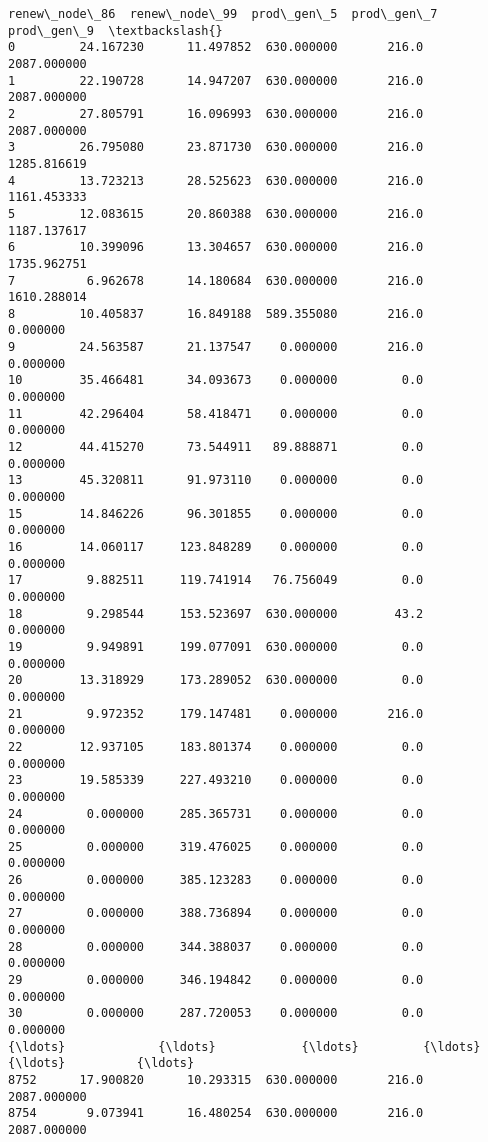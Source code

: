 \documentclass[11pt]{article}
\begin{document}
\begin{Verbatim}[commandchars=\\\{\}]
      renew\_node\_86  renew\_node\_99  prod\_gen\_5  prod\_gen\_7   prod\_gen\_9  \textbackslash{}
0         24.167230      11.497852  630.000000       216.0  2087.000000   
1         22.190728      14.947207  630.000000       216.0  2087.000000   
2         27.805791      16.096993  630.000000       216.0  2087.000000   
3         26.795080      23.871730  630.000000       216.0  1285.816619   
4         13.723213      28.525623  630.000000       216.0  1161.453333   
5         12.083615      20.860388  630.000000       216.0  1187.137617   
6         10.399096      13.304657  630.000000       216.0  1735.962751   
7          6.962678      14.180684  630.000000       216.0  1610.288014   
8         10.405837      16.849188  589.355080       216.0     0.000000   
9         24.563587      21.137547    0.000000       216.0     0.000000   
10        35.466481      34.093673    0.000000         0.0     0.000000   
11        42.296404      58.418471    0.000000         0.0     0.000000   
12        44.415270      73.544911   89.888871         0.0     0.000000   
13        45.320811      91.973110    0.000000         0.0     0.000000   
15        14.846226      96.301855    0.000000         0.0     0.000000   
16        14.060117     123.848289    0.000000         0.0     0.000000   
17         9.882511     119.741914   76.756049         0.0     0.000000   
18         9.298544     153.523697  630.000000        43.2     0.000000   
19         9.949891     199.077091  630.000000         0.0     0.000000   
20        13.318929     173.289052  630.000000         0.0     0.000000   
21         9.972352     179.147481    0.000000       216.0     0.000000   
22        12.937105     183.801374    0.000000         0.0     0.000000   
23        19.585339     227.493210    0.000000         0.0     0.000000   
24         0.000000     285.365731    0.000000         0.0     0.000000   
25         0.000000     319.476025    0.000000         0.0     0.000000   
26         0.000000     385.123283    0.000000         0.0     0.000000   
27         0.000000     388.736894    0.000000         0.0     0.000000   
28         0.000000     344.388037    0.000000         0.0     0.000000   
29         0.000000     346.194842    0.000000         0.0     0.000000   
30         0.000000     287.720053    0.000000         0.0     0.000000   
{\ldots}             {\ldots}            {\ldots}         {\ldots}         {\ldots}          {\ldots}   
8752      17.900820      10.293315  630.000000       216.0  2087.000000   
8754       9.073941      16.480254  630.000000       216.0  2087.000000   

\end{Verbatim}
\end{document}
